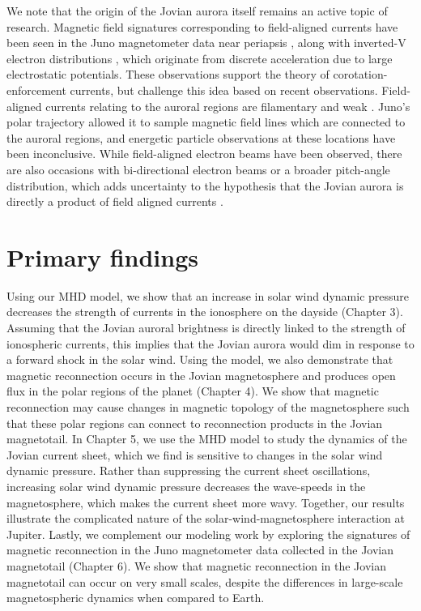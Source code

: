 We note that the origin of the Jovian aurora itself remains an active topic of research. Magnetic field signatures corresponding to field-aligned currents have been seen in the Juno magnetometer data near periapsis \cite{Kotsiaros2019BirkelandSpacecraft}, along with inverted-V electron distributions \cite{Mauk2017TheMission}, which originate from discrete acceleration due to large electrostatic potentials. These observations support the theory of corotation-enforcement currents, but  challenge this idea based on recent observations. Field-aligned currents relating to the auroral regions are filamentary and weak \cite{Kotsiaros2019BirkelandSpacecraft}. Juno's polar trajectory allowed it to sample magnetic field lines which are connected to the auroral regions, and energetic particle observations at these locations have been inconclusive. While field-aligned electron beams have been observed, there are also occasions with bi-directional electron beams or a broader pitch-angle distribution, which adds uncertainty to the hypothesis that the Jovian aurora is directly a product of field aligned currents \cite{Mauk2018DiverseAurora}.

\section{Primary findings}

Using our MHD model, we show that an increase in solar wind dynamic pressure decreases the strength of currents in the ionosphere on the dayside (Chapter 3). Assuming that the Jovian auroral brightness is directly linked to the strength of ionospheric currents, this implies that the Jovian aurora would dim in response to a forward shock in the solar wind. Using the model, we also demonstrate that magnetic reconnection occurs in the Jovian magnetosphere and produces open flux in the polar regions of the planet (Chapter 4). We show that magnetic reconnection may cause changes in magnetic topology of the magnetosphere such that these polar regions can connect to reconnection products in the Jovian magnetotail. In Chapter 5, we use the MHD model to study the dynamics of the Jovian current sheet, which we find is sensitive to changes in the solar wind dynamic pressure. Rather than suppressing the current sheet oscillations, increasing solar wind dynamic pressure decreases the wave-speeds in the magnetosphere, which makes the current sheet more wavy. Together, our results illustrate the complicated nature of the solar-wind-magnetosphere interaction at Jupiter. Lastly, we complement our modeling work by exploring the signatures of magnetic reconnection in the Juno magnetometer data collected in the Jovian magnetotail (Chapter 6). We show that magnetic reconnection in the Jovian magnetotail can occur on very small scales, despite the differences in large-scale magnetospheric dynamics when compared to Earth. 

